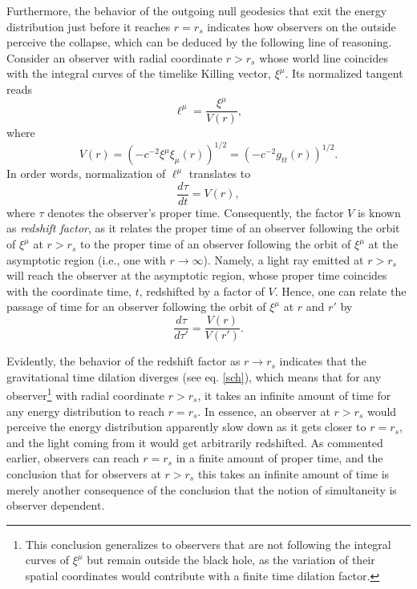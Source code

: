 \documentclass[
12pt,		%
openright,	%
twoside,  %
a4paper,			%
chapter=TITLE,		%
english,			%
french,				%
spanish,			%
brazil				%
]{USPSC-classe/USPSC}
\begin{document}
Furthermore, the behavior of the outgoing null geodesics that exit the energy distribution just before it reaches $r=r_s$ indicates how observers on the outside perceive the collapse, which can be deduced by the following line of reasoning. Consider an observer with radial coordinate $r>r_s$ whose world line coincides with the integral curves of the timelike Killing vector, $\xi^{\mu}$. Its normalized tangent reads
\begin{equation}\label{ell1}
    \ell^{\mu}=\frac{\xi^{\mu}}{V(r)},
\end{equation}
where 
\begin{equation}\label{reds}
    V(r)=(-c^{-2}\xi^{\mu}\xi_{\mu}(r))^{1/2}=(-c^{-2}g_{tt}(r))^{1/2}.
\end{equation} 
In order words, normalization of $\ell^{\mu}$ translates to
\begin{equation}
    \frac{d\tau}{dt}=V(r),
\end{equation}
where $\tau$ denotes the observer's proper time. Consequently, the factor $V$ is known as \textit{redshift factor}, as it relates the proper time of an observer following the orbit of $\xi^{\mu}$ at $r>r_s$ to the proper time of an observer following the orbit of $\xi^{\mu}$ at the asymptotic region (i.e., one with $r\to\infty$). Namely, a light ray emitted at $r>r_s$ will reach the observer at the asymptotic region, whose proper time coincides with the coordinate time, $t$, redshifted by a factor of $V$. Hence, one can relate the passage of time for an observer following the orbit of $\xi^{\mu}$ at $r$ and $r'$ by
\begin{equation}
    \frac{d\tau}{d\tau'}=\frac{V(r)}{V(r')}.
\end{equation}

Evidently, the behavior of the redshift factor as $r\to r_s$ indicates that the gravitational time dilation diverges (see eq. \ref{sch}), which means that for any observer\footnote{This conclusion generalizes to observers that are not following the integral curves of $\xi^{\mu}$ but remain outside the black hole, as the variation of their spatial coordinates would contribute with a finite time dilation factor.} with radial coordinate $r>r_s$, it takes an infinite amount of time for any energy distribution to reach $r=r_s$. In essence, an observer at $r>r_s$ would perceive the energy distribution apparently slow down as it gets closer to $r=r_s$, and the light coming from it would get arbitrarily redshifted. As commented earlier, observers can reach $r=r_s$ in a finite amount of proper time, and the conclusion that for observers at $r>r_s$ this takes an infinite amount of time is merely another consequence of the conclusion that the notion of simultaneity is observer dependent.
\end{document}
